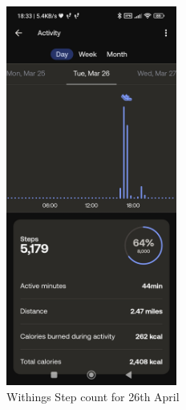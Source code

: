 \begin{figure}
    
    \centering
    \includegraphics[width=0.5\textwidth,keepaspectratio]{../images/WithingsActivity.jpg}
    \caption{Withings Step count for 26th April}
    \label{fig:withingsSteps}
    
\end{figure}

